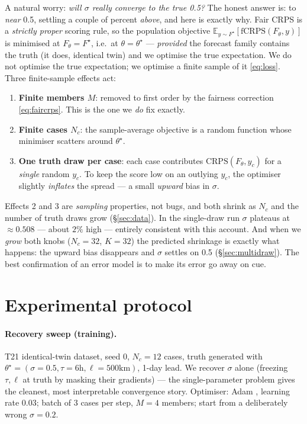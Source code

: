 \documentclass[11pt]{article}
\newcommand{\E}{\mathbb{E}}
\begin{document}
A natural worry: \emph{will $\sigma$ really converge to the true 0.5?} The honest
answer is: to \emph{near} 0.5, settling a couple of percent \emph{above}, and here
is exactly why. Fair CRPS is a \emph{strictly proper} scoring rule, so the
population objective $\E_{y\sim F^\star}[\mathrm{fCRPS}(F_\theta,y)]$ is minimised
at $F_\theta=F^\star$, i.e.\ at $\theta=\theta^\star$ --- \emph{provided} the
forecast family contains the truth (it does, identical twin) and we optimise the
true expectation. We do not optimise the true expectation; we optimise a finite
sample of it \eqref{eq:loss}. Three finite-sample effects act:
\begin{enumerate}
\item \textbf{Finite members $M$}: removed to first order by the fairness
  correction \eqref{eq:faircrps}. This is the one we \emph{do} fix exactly.
\item \textbf{Finite cases $N_c$}: the sample-average objective is a random
  function whose minimiser scatters around $\theta^\star$.
\item \textbf{One truth draw per case}: each case contributes
  $\mathrm{CRPS}(F_\theta, y_c)$ for a \emph{single} random $y_c$. To keep the
  score low on an outlying $y_c$, the optimiser slightly \emph{inflates} the
  spread --- a small \emph{upward} bias in $\sigma$.
\end{enumerate}
Effects 2 and 3 are \emph{sampling} properties, not bugs, and both shrink as
$N_c$ and the number of truth draws grow (\S\ref{sec:data}). In the single-draw
run $\sigma$ plateaus at $\approx 0.508$ --- about $2\%$ high --- entirely
consistent with this account. And when we \emph{grow} both knobs
($N_c{=}32$, $K{=}32$) the predicted shrinkage is exactly what happens: the upward
bias disappears and $\sigma$ settles on 0.5 (\S\ref{sec:multidraw}). The best
confirmation of an error model is to make its error go away on cue.

\section{Experimental protocol}\label{sec:protocol}

\paragraph{Recovery sweep (training).} T21 identical-twin dataset, seed 0, $N_c=12$
cases, truth generated with $\theta^\star=(\sigma{=}0.5,\tau{=}6\text{h},
\ell{=}500\text{km})$, 1-day lead. We recover $\sigma$ alone (freezing $\tau,\ell$
at truth by masking their gradients) --- the single-parameter problem gives the
cleanest, most interpretable convergence story. Optimiser: Adam
\citep{kingma2015adam}, learning rate $0.03$; batch of 3 cases per step,
$M=4$ members; start from a deliberately wrong $\sigma=0.2$.
\end{document}
